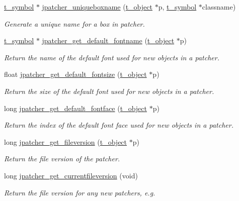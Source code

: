 \begin{DoxyCompactItemize}
\hyperlink{structt__symbol}{t\_\-symbol} $\ast$ \hyperlink{group__jpatcher_ga8538a0402d6936dd0838a52b4d43c56a}{jpatcher\_\-uniqueboxname} (\hyperlink{structt__object}{t\_\-object} $\ast$p, \hyperlink{structt__symbol}{t\_\-symbol} $\ast$classname)
\begin{DoxyCompactList}\small\item\em Generate a unique name for a box in patcher. \item\end{DoxyCompactList}\item 
\hyperlink{structt__symbol}{t\_\-symbol} $\ast$ \hyperlink{group__jpatcher_gac5cb14bf7507096591e66b88b7ad0e87}{jpatcher\_\-get\_\-default\_\-fontname} (\hyperlink{structt__object}{t\_\-object} $\ast$p)
\begin{DoxyCompactList}\small\item\em Return the name of the default font used for new objects in a patcher. \item\end{DoxyCompactList}\item 
float \hyperlink{group__jpatcher_ga2a84ae15f52f7793d7e14d26cf555534}{jpatcher\_\-get\_\-default\_\-fontsize} (\hyperlink{structt__object}{t\_\-object} $\ast$p)
\begin{DoxyCompactList}\small\item\em Return the size of the default font used for new objects in a patcher. \item\end{DoxyCompactList}\item 
long \hyperlink{group__jpatcher_ga2ab66cc8938565435fcf1fc97d73161a}{jpatcher\_\-get\_\-default\_\-fontface} (\hyperlink{structt__object}{t\_\-object} $\ast$p)
\begin{DoxyCompactList}\small\item\em Return the index of the default font face used for new objects in a patcher. \item\end{DoxyCompactList}\item 
long \hyperlink{group__jpatcher_gaac7f1696b3346197cb8f1c0dac954780}{jpatcher\_\-get\_\-fileversion} (\hyperlink{structt__object}{t\_\-object} $\ast$p)
\begin{DoxyCompactList}\small\item\em Return the file version of the patcher. \item\end{DoxyCompactList}\item 
long \hyperlink{group__jpatcher_gac06ed9b2aa744159810c7a735b8be890}{jpatcher\_\-get\_\-currentfileversion} (void)
\begin{DoxyCompactList}\small\item\em Return the file version for any new patchers, e.g. \item\end{DoxyCompactList}\end{DoxyCompactItemize}


